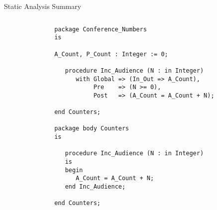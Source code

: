\documentclass{beamer}
\begin{document}
\begin{frame}[fragile]{Static Analysis Summary}
  \begin{columns}
  \begin{column}{3cm}
  \begin{center}
  \end{center}
  \end{column}
  \begin{column}{9cm}
    
     \begin{lstlisting}[language=SPARK]
package Conference_Numbers 
is 

A_Count, P_Count : Integer := 0;

   procedure Inc_Audience (N : in Integer)
      with Global => (In_Out => A_Count),
           Pre    => (N >= 0),
           Post   => (A_Count = A_Count + N);

end Counters;

package body Counters 
is 

   procedure Inc_Audience (N : in Integer)
   is
   begin
      A_Count = A_Count + N;
   end Inc_Audience;

end Counters;


\end{lstlisting}

   \end{column}
   \end{columns}

\end{frame}
\end{document}
